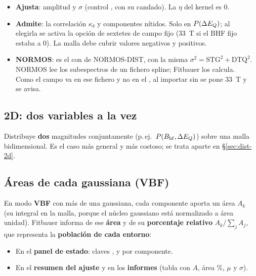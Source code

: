 \begin{itemize}[nosep]
  \item \textbf{Ajusta}: amplitud y $\sigma$ (control ,
        con su candado). La $\eta$ del kernel es 0.
  \item \textbf{Admite}: la correlación $\kappa_\delta$ y componentes nítidos.
        Solo en $P(\Delta E_{Q})$; al elegirla se activa la opción de sextetes de campo
        fijo (33~T si el BHF fijo estaba a 0). La malla debe cubrir valores
        negativos y positivos.
  \item \textbf{NORMOS}: es el  con  de
        NORMOS-DIST, con la misma $\sigma^2=\mathrm{STG}^2+\mathrm{DTQ}^2$.
        NORMOS lee los subespectros de un fichero spline; Fitbauer los calcula.
        Como el campo va en ese fichero y no en el , al importar
        sin  se pone 33~T y se avisa.
\end{itemize}

\subsection{2D: dos variables a la vez}
\label{sec:forma-2d}

Distribuye \textbf{dos} magnitudes conjuntamente (p.\,ej.\ $P(B_{\mathrm{hf}},\Delta E_{Q})$) sobre
una malla bidimensional. Es el caso más general y más costoso; se trata aparte en
§\ref{sec:dist-2d}.

\subsection{Áreas de cada gaussiana (VBF)}
\label{sec:vbf-areas}

En modo \textbf{VBF} con más de una gaussiana, cada componente aporta un área
$A_k$ (su integral en la malla, porque el núcleo gaussiano está normalizado a
área unidad). Fitbauer informa de ese \textbf{área} y de su \textbf{porcentaje
relativo} $A_k/\sum_j A_j$, que representa la \textbf{población de cada entorno}:

\begin{itemize}[nosep]
  \item En el \textbf{panel de estado}: claves ,
         y  por componente.
  \item En el \textbf{resumen del ajuste} y en los \textbf{informes} (tabla con
        $A$, área \%, $\mu$ y $\sigma$).
\end{itemize}

